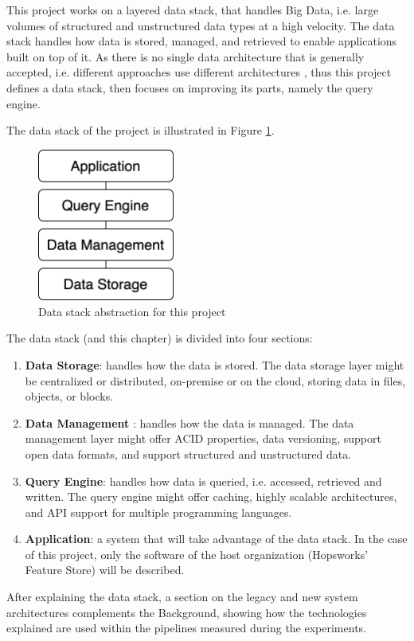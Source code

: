 This project works on a layered data stack, that handles Big Data, i.e. large volumes of structured and unstructured data types at a high velocity. The data stack handles how data is stored, managed, and retrieved to enable applications built on top of it. 
As there is no single data architecture that is generally accepted, i.e. different approaches use different architectures \cite{framptonCompleteGuideOpen2018,sakrBigDataProcessing2017}, thus this project defines a data stack, then focuses on improving its parts, namely the query engine. 

The data stack of the project is illustrated in Figure \ref{fig:data_stack}.

\begin{figure}[!ht]
    \begin{center}
      \includegraphics[width=0.4\textwidth]{figures/2-background/data_stack.png}
    \end{center}
    \caption{Data stack abstraction for this project}
    \label{fig:data_stack}
\end{figure}

The data stack (and this chapter) is divided into four sections:
\begin{enumerate}
    \item \textbf{Data Storage}: handles how the data is stored. The data storage layer might be centralized or distributed, on-premise or on the cloud, storing data in files, objects, or blocks.
    \item \textbf{Data Management} : handles how the data is managed. The data management layer might offer \gls{ACID} properties, data versioning, support open data formats, and support structured and unstructured data.
    \item \textbf{Query Engine}: handles how data is queried, i.e. accessed, retrieved and written. The query engine might offer caching, highly scalable architectures, and \gls{API} support for multiple programming languages.
    \item \textbf{Application}: a system that will take advantage of the data stack. In the case of this project, only the software of the host organization (Hopsworks' Feature Store) will be described. 
\end{enumerate}
After explaining the data stack, a section on the legacy and new system architectures complements the Background, showing how the technologies explained are used within the pipelines measured during the experiments.

